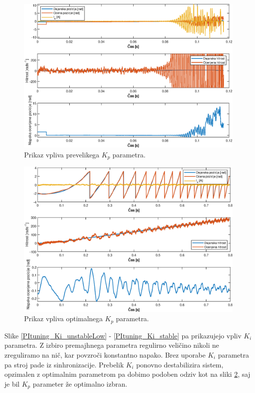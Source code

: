 \documentclass[a4paper,twoside,openright,12pt,slovene]{book}
\begin{document}
\begin{figure}[!htbp]
    \centering
    \includegraphics[width=0.75\columnwidth]{Slike/PItuning_Kp_unstableHigh.eps}
    \caption{\label{PItuning_Kp_unstableHigh} Prikaz vpliva prevelikega $K_p$ parametra. }
\end{figure}

\begin{figure}[!htbp]
    \centering
    \includegraphics[width=0.75\columnwidth]{Slike/PItuning_Kp_stable.eps}
    \caption{\label{PItuning_Kp_stable} Prikaz vpliva optimalnega $K_p$ parametra. }
\end{figure}

Slike \ref{PItuning_Ki_unstableLow} - \ref{PItuning_Ki_stable} pa prikazujejo vpliv $K_i$ parametra. Z izbiro premajhnega parametra regulirno veličino nikoli ne zreguliramo na nič, kar povzroči
konstantno napako. Brez uporabe $K_i$ parametra pa stroj pade iz sinhronizacije. Prebelik $K_i$ ponovno destabilizira sistem, opzimalen z optimalnim parametrom pa dobimo podoben odziv kot na sliki 
\ref{PItuning_Kp_stable}, saj je bil $K_p$ parameter že optimalno izbran.
\end{document}

